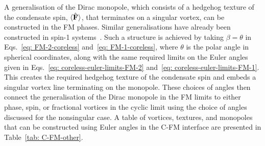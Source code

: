A generalisation of the Dirac monopole, which consists of a hedgehog texture of
the condensate spin, \(\langle \hat{\vb{F}} \rangle\), that terminates on a
singular vortex, can be constructed in the FM phases.
Similar generalisations have already been constructed in spin-1
systems~\cite{Borgh2012, Savage2003}.
Such a structure is achieved by taking \(\beta=\theta\) in
Eqs.~\eqref{eq: FM-2-coreless} and~\eqref{eq: FM-1-coreless}, where \(\theta\)
is the polar angle in spherical coordinates, along with the same required limits
on the Euler angles given in Eqs.~\eqref{eq: coreless-euler-limits-FM-2}
and~\eqref{eq: coreless-euler-limits-FM-1}.
This creates the required hedgehog texture of the condensate spin and embeds
a singular vortex line terminating on the monopole.
These choices of angles then connect the generalisation of the Dirac monopole
in the FM limits to either phase, spin, or fractional vortices in the cyclic
limit using the choice of angles discussed for the nonsingular case.
A table of vortices, textures, and monopoles that can be constructed using
Euler angles in the C-FM interface are presented in Table~\ref{tab: C-FM-other}.
